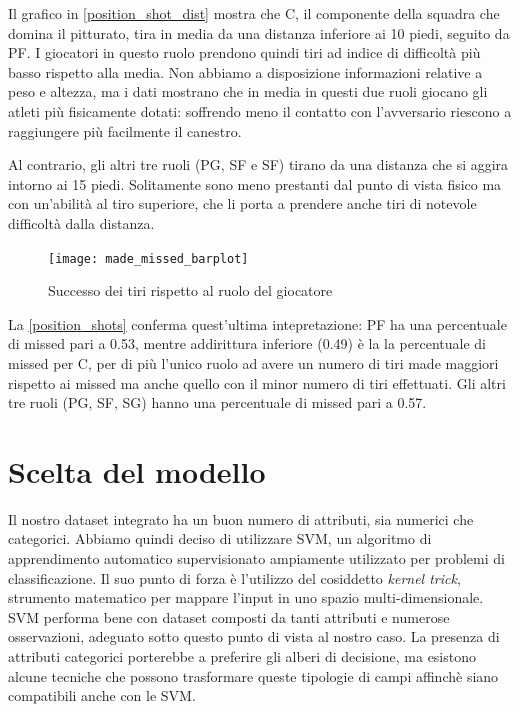 Il grafico in \autoref{position_shot_dist} mostra che C, il componente della squadra che domina il pitturato, tira in media da una distanza inferiore ai 10 piedi, seguito da PF. I giocatori in questo ruolo prendono quindi tiri ad indice di difficoltà più basso rispetto alla media.
Non abbiamo a disposizione informazioni relative a peso e altezza, ma i dati \cite{basketball-reference} mostrano che in media in questi due ruoli giocano gli atleti più fisicamente dotati: soffrendo meno il contatto con l'avversario riescono a raggiungere più facilmente il canestro.

Al contrario, gli altri tre ruoli (PG, SF e SF) tirano da una distanza che si aggira intorno ai 15 piedi. Solitamente sono meno prestanti dal punto di vista fisico ma con un'abilità al tiro superiore, che li porta a prendere anche tiri di notevole difficoltà dalla distanza.

\begin{figure}[H]
\caption{Successo dei tiri rispetto al ruolo del giocatore}
\label{position_shots}
\texttt{[image: made\_missed\_barplot]}
\end{figure}

La \autoref{position_shots} conferma quest'ultima intepretazione: PF ha una percentuale di missed pari a 0.53, mentre addirittura inferiore (0.49) è la la percentuale di missed per C, per di più l'unico ruolo ad avere un numero di tiri made maggiori rispetto ai missed ma anche quello con il minor numero di tiri effettuati.
Gli altri tre ruoli (PG, SF, SG) hanno una percentuale di missed pari a 0.57.

\pagebreak

\section{Scelta del modello}

Il nostro dataset integrato ha un buon numero di attributi, sia numerici che categorici.
Abbiamo quindi deciso di utilizzare SVM, un algoritmo di apprendimento automatico supervisionato ampiamente utilizzato per problemi di classificazione. Il suo punto di forza è l'utilizzo del cosiddetto \textit{kernel trick}, strumento matematico per mappare l'input in uno spazio multi-dimensionale. SVM performa bene con dataset composti da tanti attributi e numerose osservazioni, adeguato sotto questo punto di vista al nostro caso.
La presenza di attributi categorici porterebbe a preferire gli alberi di decisione, ma esistono alcune tecniche che possono trasformare queste tipologie di campi affinchè siano compatibili anche con le SVM.
